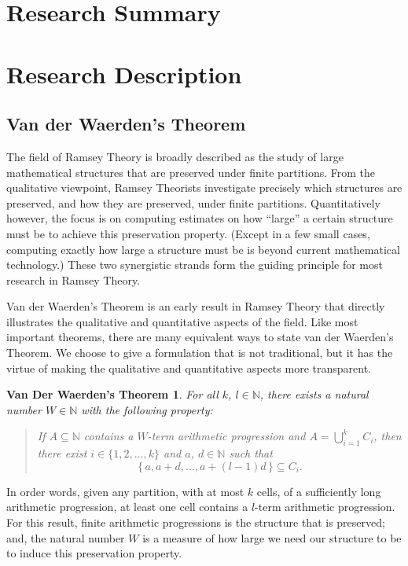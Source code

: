 \documentclass[12pt]{article}
\theoremstyle{plain}
\newtheorem*{vdw}{Van Der Waerden's Theorem}
\theoremstyle{definition}
\newcommand{\bbN}{\mathbb{N}}
\begin{document}
\section{Research Summary}

\section{Research Description}
\subsection{Van der Waerden's Theorem}
The field of Ramsey Theory is broadly described as the study of large
mathematical structures that are preserved under finite partitions.
From the qualitative viewpoint, Ramsey Theorists investigate precisely which
structures are preserved, and how they are preserved, under
finite partitions.
Quantitatively however, the focus is on computing estimates on how ``large'' a
certain structure must be to achieve this preservation property. 
(Except in a few small cases, computing exactly how large a structure
must be is beyond current mathematical technology.)
These two synergistic strands form the guiding principle for most research
in Ramsey Theory.

Van der Waerden's Theorem is an early result
\cite{Van-der-Waerden:1927fk} in Ramsey Theory that
directly illustrates the qualitative and quantitative aspects of the
field. 
Like most important theorems, there are many equivalent ways to state
van der Waerden's Theorem.
We choose to give a formulation that is not traditional, but it has
the virtue of making the qualitative and quantitative aspects more
transparent. 

  \begin{vdw}
    For all $k$, $l \in \bbN$, there exists a natural number $W \in
    \bbN$ with the following property: 
      \begin{quote}
        If $A \subseteq \bbN$ contains a $W$-term arithmetic
        progression and $A = \bigcup_{i=1}^k C_i$, then there exist $i
        \in \{1, 2, \ldots, k \}$ and $a$, $d \in \bbN$ such that 
          \[
            \{\, a, a + d, \ldots, a +(l-1)d \,\} \subseteq C_i.
          \]
      \end{quote}
  \end{vdw}

In order words, given any partition, with at most $k$ cells, of a
sufficiently long arithmetic progression, at least one cell contains a
$l$-term arithmetic progression.
For this result, finite arithmetic progressions is the structure
that is preserved; and, the natural number $W$ is a measure of how
large we need our structure to be to induce this preservation
property.
\end{document}
